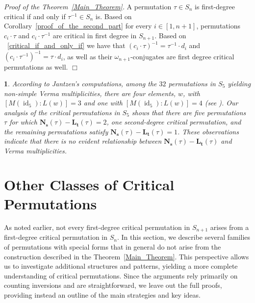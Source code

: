 \documentclass[a4 paper,12pt]{article}
\DeclareMathOperator{\id}{id}
\newtheorem{subnum}{}[numeris]
\begin{document}
\textit{Proof of the Theorem~\ref{Main_Theorem}.} A permutation $\tau\in S_n$ is first-degree critical if and only if $\tau^{-1}\in S_n$
is. Based on Corollary~\ref{proof_of_the_second_part}  for every $i\in \left[1, n+1\right]$, permutations 
$c_i\cdot \tau$ and   $c_i\cdot \tau^{-1}$ are critical in first degree in $S_{n+1}$. Based on ~\ref{critical_if_and_only_if} we have that $\left(c_i\cdot \tau\right)^{-1} = \tau^{-1}\cdot d_i$ and   $\left(c_i\cdot \tau^{-1}\right)^{-1}=\tau\cdot d_i$, as well as their $\omega_{n+1}$-conjugates are first degree critical permutations as well. \hfill $\Box$ 








	
	

\begin{subnum}	According to Jantzen's computations, among the $32$ permutations in $S_5$ yielding non-simple Verma multiplicities, there are \textit{four} elements, $w$,  with $\left[M(\id_5):L(w)\right]=3$ and \textit{one}  with $\left[M(\id_5):L(w)\right]=4$ (see \cite[5.24]{Jantzen}). Our analysis of the critical permutations in $S_5$ shows that there are  \textit{five} permutations $\tau$ for which  
$\textbf{N}_{\textbf{s}}(\tau)- \textbf{L}_{\textbf{t}}(\tau) = 2$, one second-degree critical permutation, and the remaining  permutations satisfy  $\textbf{N}_{\textbf{s}}(\tau)- \textbf{L}_{\textbf{t}}(\tau) = 1$. These observations indicate that there is no evident relationship between   $\textbf{N}_{\textbf{s}}(\tau)- \textbf{L}_{\textbf{t}}(\tau)$ and  Verma multiplicities.
\label{what_we_absurved_until_now}
\end{subnum}









\section{Other Classes of Critical Permutations}
\begin{small}As noted earlier, not every first-degree critical permutation in $S_{n+1}$ arises from 
a first-degree critical permutation in $S_n$. 
 In this section,  we describe several families of permutations with special forms 
that in general do not arise 
 from the construction described in the Theorem~\ref{Main_Theorem}. This perspective allows us to investigate additional structures and patterns, 
yielding a more complete understanding of critical permutations.  Since the arguments rely primarily on counting inversions and are straightforward, 
we leave out the full proofs, providing instead an outline of the main strategies and key ideas.\end{small}
\end{document}

